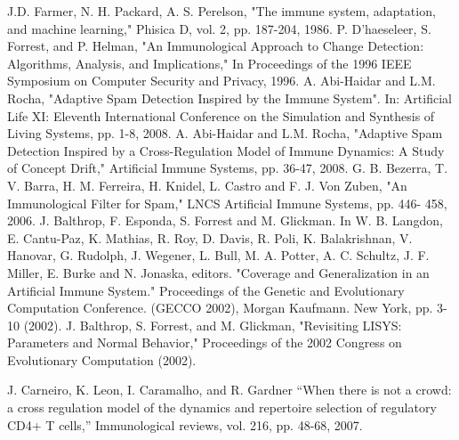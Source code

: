 \documentclass{llncs}
\begin{document}
\begin{thebibliography}{99.}
 J.D. Farmer, N. H. Packard, A. S. Perelson, "The immune system, adaptation, and machine learning," Phisica D, vol. 2, pp. 187-204, 1986. 
 P. D'haeseleer, S. Forrest, and P. Helman, "An Immunological Approach to Change Detection: Algorithms, Analysis, and Implications,"  In Proceedings of the 1996 IEEE Symposium on Computer Security and Privacy, 1996.
 A. Abi-Haidar and L.M. Rocha,  "Adaptive Spam Detection Inspired by the Immune System". In:  Artificial Life XI: Eleventh International Conference on the Simulation and Synthesis of Living Systems, pp. 1-8, 2008.
 A. Abi-Haidar and L.M. Rocha, "Adaptive Spam Detection Inspired by a Cross-Regulation Model of Immune Dynamics: A Study of Concept Drift," 	Artificial Immune Systems, pp. 36-47, 2008.
 G. B. Bezerra, T. V. Barra, H. M. Ferreira, H. Knidel, L.  Castro and F. J. Von Zuben, "An Immunological Filter for Spam," LNCS 	Artificial Immune Systems, pp. 446- 458, 2006. 
 J. Balthrop, F. Esponda, S. Forrest and M. Glickman. In W. B. Langdon, E. Cantu-Paz, K. Mathias, R. Roy, D. Davis, R. Poli, K. Balakrishnan, V. Hanovar, G. Rudolph, J. Wegener, L. Bull, M. A. Potter, A. C. Schultz, J. F. Miller, E. Burke and N. Jonaska, editors. "Coverage and Generalization in an Artificial Immune System." Proceedings of the Genetic and Evolutionary Computation Conference. (GECCO 2002), Morgan Kaufmann. New York, pp. 3-10 (2002).
  J. Balthrop, S. Forrest, and M. Glickman, "Revisiting LISYS: Parameters and Normal Behavior," Proceedings of the 2002 Congress on Evolutionary Computation  (2002).

 J. Carneiro, K. Leon, I. Caramalho, and R. Gardner “When there is not a crowd: a cross regulation model of the dynamics and repertoire selection of regulatory CD4+ T cells,” Immunological reviews, vol. 216, pp. 48-68, 2007.


\end{thebibliography}

\end{document}
